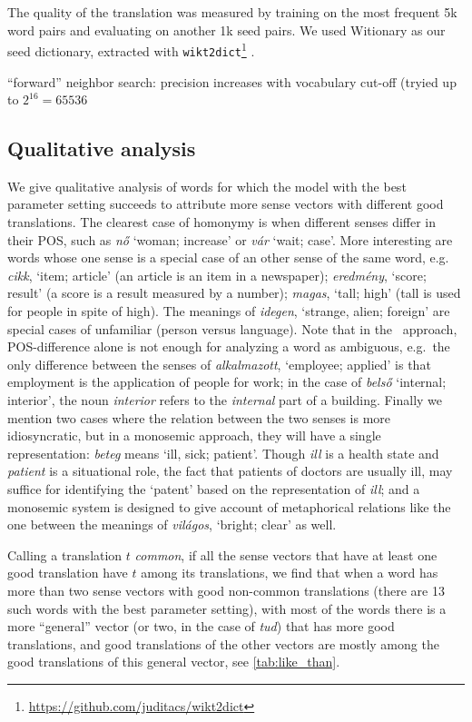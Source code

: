 \documentclass[11pt]{article}
\begin{document}
The quality of the translation was measured by training on the most frequent 5k
word pairs and evaluating on another 1k seed pairs.  We used Witionary as our
seed dictionary, extracted with
\texttt{wikt2dict}\footnote{\url{https://github.com/juditacs/wikt2dict}}
\citep{Acs:2016}. 

``forward'' neighbor search: precision increases with vocabulary cut-off
(tryied up to $2^{16}=65536$

\subsection{Qualitative analysis}

We give qualitative analysis of words for which the model with the best
parameter setting succeeds to attribute more sense vectors with different good
translations. The clearest case of homonymy is when different senses differ in
their POS, such as \emph{nő} `woman; increase' or \emph{vár} `wait; case'.
More interesting are words whose one sense is a special case of an other sense
of the same word, e.g.~ \emph{cikk}, `item; article' (an
article is an item in a newspaper); \emph{eredmény}, `score; result' (a score
is a result measured by a number); \emph{magas}, `tall; high' (tall is used for
people in spite of high). The meanings of \emph{idegen}, `strange, alien;
foreign' are special cases of unfamiliar (person versus language).  Note that
in the \fl~approach, POS-difference alone is not enough for analyzing a word as
ambiguous, e.g.~the only difference between the senses of \emph{alkalmazott},
`employee; applied' is that employment is the application of people for work;
in the case of \emph{belső} `internal; interior', the noun \emph{interior}
refers to the \emph{internal} part of a building. Finally we mention two cases
where the relation between the two senses is more idiosyncratic, but in a
monosemic approach, they will have a single representation: \emph{beteg} means
`ill, sick; patient'. Though \emph{ill} is a health state and \emph{patient} is
a situational role, the fact that patients of doctors are usually ill, may
suffice for identifying the `patent' based on the representation of
\emph{ill}; and a monosemic system is designed to give account of metaphorical
relations like the one between the meanings of \emph{világos}, `bright; clear'
as well.

Calling a translation $t$ \emph{common}, if all the sense vectors that have at
least one good translation have $t$ among its translations, we find that when a
word has more than two sense vectors with good non-common translations (there
are 13 such words with the best parameter setting), with most of the words
there is a more ``general'' vector (or two, in the case of \emph{tud}) that has
more good translations, and good translations of the other vectors are mostly
among the good translations of this general vector, see
\autoref{tab:like_than}.
\end{document}

